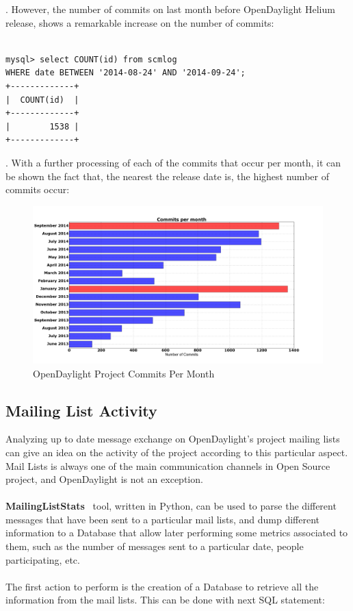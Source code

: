 \documentclass[a4paper, 12pt]{book}
\begin{document}
. However, the number of commits on last month before OpenDaylight Helium release, shows a remarkable increase on the number of commits:

\begin{verbatim}

mysql> select COUNT(id) from scmlog
WHERE date BETWEEN '2014-08-24' AND '2014-09-24';
+-------------+
|  COUNT(id)  |
+-------------+
|        1538 |
+-------------+

\end{verbatim}
.
With a further processing of each of the commits that occur per month, it can be shown the fact that, the nearest the release date is, the highest number of commits occur:
\begin{center}
 \begin{figure}[H]
 \begin{center}
   \includegraphics[width=17cm]{img/commits_month_01.png}
   \caption{OpenDaylight Project Commits Per Month}
   \label{fig:odl_commits_month}
 \end{center}
 \end{figure}
\end{center}

\subsection{Mailing List Activity}
Analyzing up to date message exchange on OpenDaylight's project mailing lists can give an idea on the activity of the project according to this particular aspect. Mail Lists is always one of the main communication channels in Open Source project, and OpenDaylight is not an exception.\\
\\
{\textbf{MailingListStats}}~\cite{MailStats} tool, written in Python, can be used to parse the different messages that have been sent to a particular mail lists, and dump different information to a Database that allow later performing some metrics associated to them, such as the number of messages sent to a particular date, people participating, etc.\\
\\
The first action to perform is the creation of a Database to retrieve all the information from the mail lists. This can be done with next SQL statement:
\end{document}
